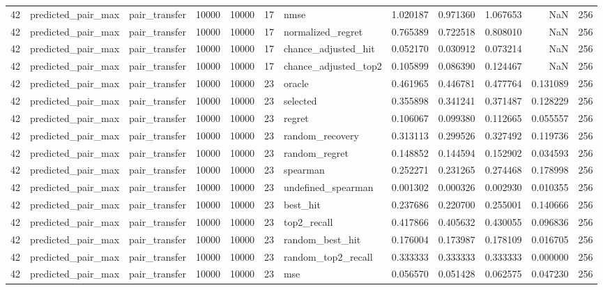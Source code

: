 \begin{tabular}{rllrrrlrrrrr}
42 & predicted_pair_max & pair_transfer & 10000 & 10000 & 17 & nmse & 1.020187 & 0.971360 & 1.067653 & NaN & 256 \\
42 & predicted_pair_max & pair_transfer & 10000 & 10000 & 17 & normalized_regret & 0.765389 & 0.722518 & 0.808010 & NaN & 256 \\
42 & predicted_pair_max & pair_transfer & 10000 & 10000 & 17 & chance_adjusted_hit & 0.052170 & 0.030912 & 0.073214 & NaN & 256 \\
42 & predicted_pair_max & pair_transfer & 10000 & 10000 & 17 & chance_adjusted_top2 & 0.105899 & 0.086390 & 0.124467 & NaN & 256 \\
42 & predicted_pair_max & pair_transfer & 10000 & 10000 & 23 & oracle & 0.461965 & 0.446781 & 0.477764 & 0.131089 & 256 \\
42 & predicted_pair_max & pair_transfer & 10000 & 10000 & 23 & selected & 0.355898 & 0.341241 & 0.371487 & 0.128229 & 256 \\
42 & predicted_pair_max & pair_transfer & 10000 & 10000 & 23 & regret & 0.106067 & 0.099380 & 0.112665 & 0.055557 & 256 \\
42 & predicted_pair_max & pair_transfer & 10000 & 10000 & 23 & random_recovery & 0.313113 & 0.299526 & 0.327492 & 0.119736 & 256 \\
42 & predicted_pair_max & pair_transfer & 10000 & 10000 & 23 & random_regret & 0.148852 & 0.144594 & 0.152902 & 0.034593 & 256 \\
42 & predicted_pair_max & pair_transfer & 10000 & 10000 & 23 & spearman & 0.252271 & 0.231265 & 0.274468 & 0.178998 & 256 \\
42 & predicted_pair_max & pair_transfer & 10000 & 10000 & 23 & undefined_spearman & 0.001302 & 0.000326 & 0.002930 & 0.010355 & 256 \\
42 & predicted_pair_max & pair_transfer & 10000 & 10000 & 23 & best_hit & 0.237686 & 0.220700 & 0.255001 & 0.140666 & 256 \\
42 & predicted_pair_max & pair_transfer & 10000 & 10000 & 23 & top2_recall & 0.417866 & 0.405632 & 0.430055 & 0.096836 & 256 \\
42 & predicted_pair_max & pair_transfer & 10000 & 10000 & 23 & random_best_hit & 0.176004 & 0.173987 & 0.178109 & 0.016705 & 256 \\
42 & predicted_pair_max & pair_transfer & 10000 & 10000 & 23 & random_top2_recall & 0.333333 & 0.333333 & 0.333333 & 0.000000 & 256 \\
42 & predicted_pair_max & pair_transfer & 10000 & 10000 & 23 & mse & 0.056570 & 0.051428 & 0.062575 & 0.047230 & 256 \\

\end{tabular}
